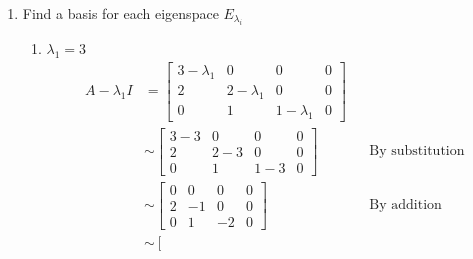 \documentclass[10pt,letterpaper,final]{report}
\newcommand{\reason}[1]{&& \text{#1}}
\begin{document}
\begin{enumerate}[label=(\alph*)]
        Since the eigenvalues are the roots of this polynomial, therefore
        \begin{enumerate}
          \item $\lambda_1 = 3$
          \item $\lambda_2 = 2$
          \item $\lambda_3 = 1$
        \end{enumerate}
  \item Find a basis for each eigenspace $E_{\lambda_i}$
        \begin{enumerate}
          \item $\lambda_1 = 3$
                \begin{align*}
                  A - \lambda_1 I & = \left[\begin{array}{rrr|r}
                                          3 - \lambda_1 & 0             & 0             & 0 \\
                                          2             & 2 - \lambda_1 & 0             & 0 \\
                                          0             & 1             & 1 - \lambda_1 & 0
                                        \end{array}\right]                               \\[1ex]
                                  & \sim \left[\begin{array}{rrr|r}
                                             3 - 3 & 0     & 0     & 0 \\
                                             2     & 2 - 3 & 0     & 0 \\
                                             0     & 1     & 1 - 3 & 0
                                           \end{array}\right] \reason{By substitution}                                    \\[1ex]
                                  & \sim \left[\begin{array}{rrr|r}
                                             0 & 0  & 0  & 0 \\
                                             2 & -1 & 0  & 0 \\
                                             0 & 1  & -2 & 0
                                           \end{array}\right] \reason{By addition}                                        \\[1ex]
                                  & \sim \left[\begin{array}{rrr|r}

\end{array}
\end{align*}
\end{enumerate}
\end{enumerate}
\end{document}

